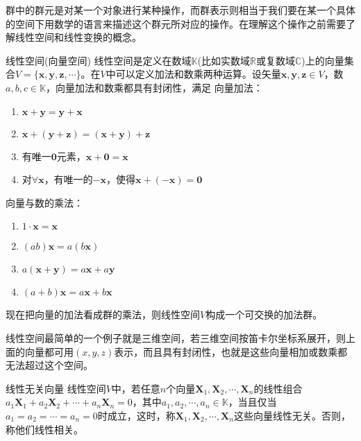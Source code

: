群中的群元是对某一个对象进行某种操作，而群表示则相当于我们要在某一个具体的空间下用数学的语言来描述这个群元所对应的操作。在理解这个操作之前需要了解线性空间和线性变换的概念。
\begin{definition}{线性空间(向量空间)}
	线性空间是定义在数域$\mathbb{K}$(比如实数域$\mathbb{R}$或复数域$\mathbb{C}$)上的向量集合$V = \{\bm{x}, \bm{y}, \bm{z}, \cdots\}$。在$V$中可以定义加法和数乘两种运算。设矢量$\bm{x}, \bm{y}, \bm{z} \in V$，数$a , b , c \in \mathbb{K}$，向量加法和数乘都具有封闭性，满足\newline
	向量加法：
	\begin{enumerate}
		\item $\bm{x} + \bm{y} = \bm{y} + \bm{x}$
		\item $\bm{x} + ( \bm{y} + \bm{z} ) = (\bm{x} + \bm{y}) + \bm{z}$
		\item 有唯一$\bm{0}$元素，$\bm{x} + \bm{0} = \bm{x}$
		\item 对$\forall \bm{x}$，有唯一的$-\bm{x}$，使得$\bm{x} + (-\bm{x}) = \bm{0}$
	\end{enumerate}
	向量与数的乘法：
	\begin{enumerate}
		\item $1 \cdot \bm{x} = \bm{x}$
		\item $(ab)\bm{x} = a(b\bm{x})$
		\item $a(\bm{x} + \bm{y}) = a\bm{x} + a\bm{y}$
		\item $(a + b) \bm{x} = a\bm{x} + b\bm{x}$
	\end{enumerate}
	现在把向量的加法看成群的乘法，则线性空间$V$构成一个可交换的加法群。
\end{definition} 
线性空间最简单的一个例子就是三维空间，若三维空间按笛卡尔坐标系展开，则上面的向量都可用$(x, y, z)$表示，而且具有封闭性，也就是这些向量相加或数乘都无法超过这个空间。
\begin{definition}{线性无关向量}
	线性空间$V$中，若任意$n$个向量$\bm{X}_1, \bm{X}_2, \cdots, \bm{X}_n$的线性组合$a_1\bm{X}_1 + a_2\bm{X}_2 + \cdots + a_n\bm{X}_n = 0$，其中$a_1, a_2, \cdots, a_n \in \mathbb{K}$，当且仅当$a_1 = a_2 = \cdots = a_n = 0$时成立，这时，称$\bm{X}_1, \bm{X}_2, \cdots, \bm{X}_n$这些向量线性无关。否则，称他们线性相关。
\end{definition} 

